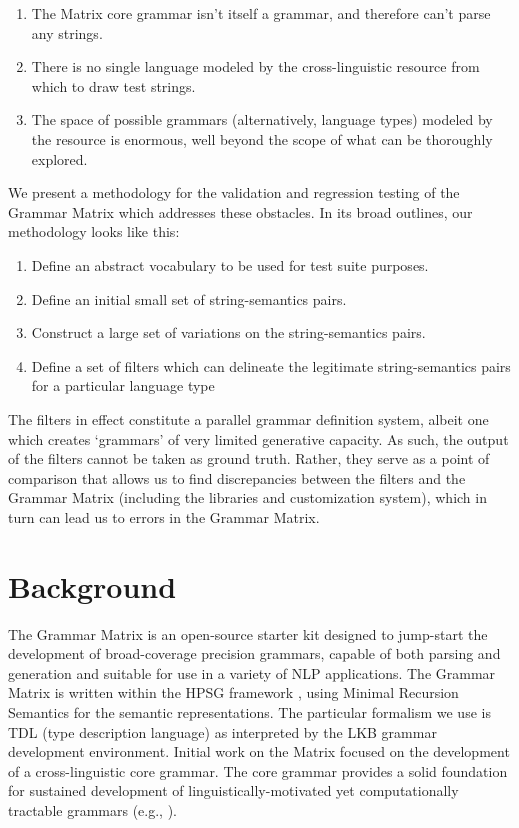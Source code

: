 \documentclass[11pt]{article}
\begin{document}
\begin{enumerate}
\item The Matrix core grammar isn't itself a grammar, and therefore
can't parse any strings.
\item There is no single language modeled by the cross-linguistic resource
from which to draw test strings.
\item The space of possible grammars (alternatively, language types) modeled
by the resource is enormous, well beyond the scope of what can be 
thoroughly explored.
\end{enumerate}

We present a methodology for the validation and regression testing of
the Grammar Matrix which addresses these obstacles. In its broad
outlines, our methodology looks like this:

\begin{enumerate}
\item Define an abstract vocabulary to be used for test suite purposes.
\item Define an initial small set of string-semantics pairs.
\item Construct a large set of variations on the string-semantics pairs.
\item Define a set of filters which can delineate the legitimate string-semantics pairs for a particular language type
\end{enumerate}
%
The filters in effect constitute a parallel grammar definition
system, albeit one which creates `grammars' of very limited generative
capacity.  As such, the output of the filters cannot be taken as
ground truth.  Rather, they serve as a point of comparison that allows
us to find discrepancies between the filters and the Grammar Matrix
(including the libraries and customization system), which in turn
can lead us to errors in the Grammar Matrix.

\section{Background}
\label{GM}

The Grammar Matrix is an open-source starter kit designed to
jump-start the development of broad-coverage precision grammars,
capable of both parsing and generation and suitable for use in a
variety of NLP applications.  The Grammar Matrix is written within the
HPSG framework \cite{Pol:Sag:94}, using Minimal
Recursion Semantics \cite{Cop:Fli:Pol:Sag:05} for the semantic
representations. The particular formalism we use is TDL
(type description language) as interpreted by the LKB
\cite{Copestake02} grammar development environment.  Initial work on
the Matrix \cite{Ben:Fli:Oep:02,Fli:Ben:03} focused on the
development of a cross-linguistic core grammar.  The core grammar
provides a solid foundation for sustained development of
linguistically-motivated yet computationally tractable grammars (e.g.,
\cite{Hel:Hau:03,Kor:Neu:05}).  
\end{document}
